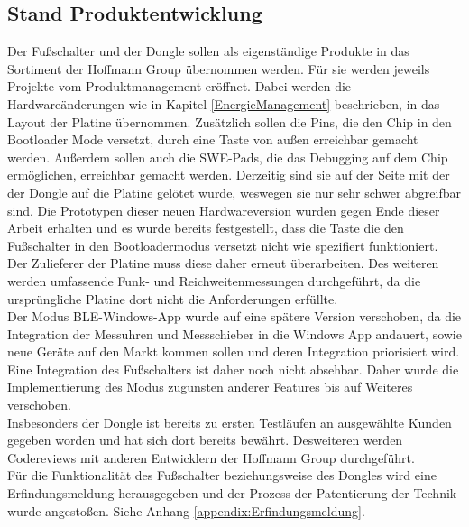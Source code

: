 \subsection{Stand Produktentwicklung}
Der Fußschalter und der Dongle sollen als eigenständige Produkte in das Sortiment der Hoffmann Group übernommen werden. Für sie werden jeweils Projekte vom Produktmanagement eröffnet. Dabei werden die Hardwareänderungen wie in Kapitel \ref{EnergieManagement} beschrieben, in das Layout der Platine übernommen. Zusätzlich sollen die Pins, die den Chip in den Bootloader Mode versetzt, durch eine Taste von außen erreichbar gemacht werden. Außerdem sollen auch die SWE-Pads, die das Debugging auf dem Chip ermöglichen, erreichbar gemacht werden. Derzeitig sind sie auf der Seite mit der der Dongle auf die Platine gelötet wurde, weswegen sie nur sehr schwer abgreifbar sind. Die Prototypen dieser neuen Hardwareversion wurden gegen Ende dieser Arbeit erhalten und es wurde bereits festgestellt, dass die Taste die den Fußschalter in den Bootloadermodus versetzt nicht wie spezifiert funktioniert. Der Zulieferer der Platine muss diese daher erneut überarbeiten. Des weiteren werden umfassende Funk- und Reichweitenmessungen durchgeführt, da die ursprüngliche Platine dort nicht die Anforderungen erfüllte.\\
Der Modus \ac{BLE}-Windows-App wurde auf eine spätere Version verschoben, da die Integration der Messuhren und Messschieber in die Windows App andauert, sowie neue Geräte auf den Markt kommen sollen und deren Integration priorisiert wird. Eine Integration des Fußschalters ist daher noch nicht absehbar. Daher wurde die Implementierung des Modus zugunsten anderer Features bis auf Weiteres verschoben.\\
Insbesonders der Dongle ist bereits zu ersten Testläufen an ausgewählte Kunden gegeben worden und hat sich dort bereits bewährt. Desweiteren werden Codereviews mit anderen Entwicklern der Hoffmann Group durchgeführt.\\
Für die Funktionalität des Fußschalter beziehungsweise des Dongles wird eine Erfindungsmeldung herausgegeben und der Prozess der Patentierung der Technik wurde angestoßen. Siehe Anhang \ref{appendix:Erfindungsmeldung}.
